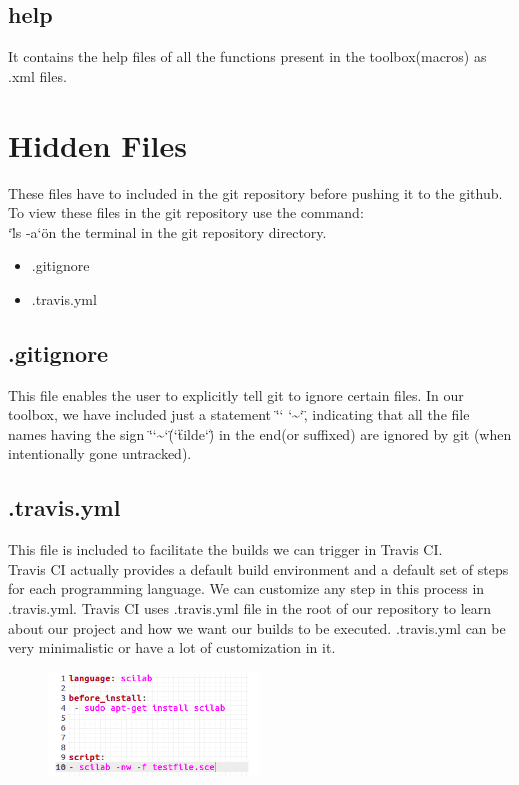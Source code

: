 \documentclass[12pt,a4paper]{report}
\begin{document}
\subsection{help}
It contains the help files of all the functions present in the toolbox(macros) as .xml files.

\section{Hidden Files}
These files have to included in the git repository before pushing it to the github. To view these files in the git repository use the command:  \\
\char`\"ls -a\char`\"   on the terminal in the git repository directory.  


\begin{itemize}
\item .gitignore 
\item .travis.yml
\end{itemize}

\subsection{.gitignore}
This file enables the user to explicitly tell git to ignore certain files. In our toolbox, we have included just a statement  \char`\" \char`\* \char`\~ \char`\" , indicating that all the file names having the sign \char`\"\char`\~\char`\" (\char`\"tilde\char`\") in the end(or suffixed) are ignored by git (when intentionally gone untracked).  

\subsection{.travis.yml}
This file is included to facilitate the builds we can trigger in Travis CI. \\
Travis CI actually provides a default build environment and a default set of steps for each programming language. We can customize any step in this process in .travis.yml. Travis CI uses .travis.yml file in the root of our repository to learn about our project and how we want our builds to be executed. .travis.yml can be very minimalistic or have a lot of customization in it.

\begin{figure}[H]
\centering
\includegraphics[width = 0.5\textwidth]{travisyml.png}
\end{figure}
\end{document}
